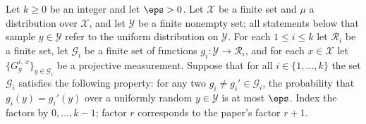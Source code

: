 \begin{lemma}\label{lem:ld-sandwich}
	\leanok
	Let $k \ge 0$ be an integer and let $\eps > 0$. Let $\mathcal X$ be a finite set and $\mu$ a distribution over $\mathcal X$, and let $\mathcal Y$ be a finite nonempty set; all statements below that sample $y \in \mathcal Y$ refer to the uniform distribution on $\mathcal Y$. For each $1 \le i \le k$ let $\mathcal R_i$ be a finite set, let $\mathcal G_i$ be a finite set of functions $g_i \colon \mathcal Y \to \mathcal R_i$, and for each $x \in \mathcal X$ let $\{G^{i,\,x}_g\}_{g \in \mathcal G_i}$ be a projective measurement. Suppose that for all $i \in \{1,\dots,k\}$ the set $\mathcal G_i$ satisfies the following property: for any two $g_i \ne g_i' \in \mathcal G_i$, the probability that $g_i(y) = g_i'(y)$ over a uniformly random $y \in \mathcal Y$ is at most $\eps$.
	Index the factors by $0,\ldots,k-1$; factor $r$ corresponds to the paper's
	factor $r+1$.


\end{lemma}
